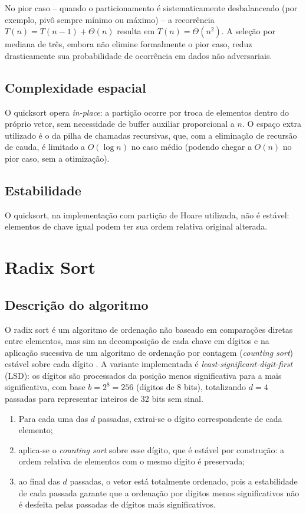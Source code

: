 \documentclass[
	12pt,
	oneside,
	a4paper,
	chapter=TITLE,
	section=TITLE,
	subsection=TITLE,
	subsubsection=TITLE,
	english,
	brazil
]{abntex2}
\theoremstyle{plain}
\theoremstyle{remark}
\renewcommand{\_}{\underscoreoriginal\allowbreak}
\begin{document}
No pior caso -- quando o particionamento é sistematicamente desbalanceado (por exemplo, pivô sempre mínimo ou máximo) -- a recorrência $T(n) = T(n-1) + \Theta(n)$ resulta em $T(n) = \Theta(n^2)$. A seleção por mediana de três, embora não elimine formalmente o pior caso, reduz drasticamente sua probabilidade de ocorrência em dados não adversariais.

\subsection{Complexidade espacial}

O quicksort opera \emph{in-place}: a partição ocorre por troca de elementos dentro do próprio vetor, sem necessidade de buffer auxiliar proporcional a $n$. O espaço extra utilizado é o da pilha de chamadas recursivas, que, com a eliminação de recursão de cauda, é limitado a $O(\log n)$ no caso médio (podendo chegar a $O(n)$ no pior caso, sem a otimização).

\subsection{Estabilidade}

O quicksort, na implementação com partição de Hoare utilizada, não é estável: elementos de chave igual podem ter sua ordem relativa original alterada.

\section{Radix Sort}

\subsection{Descrição do algoritmo}

O radix sort é um algoritmo de ordenação não baseado em comparações diretas entre elementos, mas sim na decomposição de cada chave em dígitos e na aplicação sucessiva de um algoritmo de ordenação por contagem (\emph{counting sort}) estável sobre cada dígito \cite{cormen2009}. A variante implementada é \emph{least-significant-digit-first} (LSD): os dígitos são processados da posição menos significativa para a mais significativa, com base $b = 2^{8} = 256$ (dígitos de 8 bits), totalizando $d = 4$ passadas para representar inteiros de 32 bits sem sinal.

\begin{enumerate}
	\item Para cada uma das $d$ passadas, extrai-se o dígito correspondente de cada elemento;
	\item aplica-se o \emph{counting sort} sobre esse dígito, que é estável por construção: a ordem relativa de elementos com o mesmo dígito é preservada;
	\item ao final das $d$ passadas, o vetor está totalmente ordenado, pois a estabilidade de cada passada garante que a ordenação por dígitos menos significativos não é desfeita pelas passadas de dígitos mais significativos.
\end{enumerate}
\end{document}
